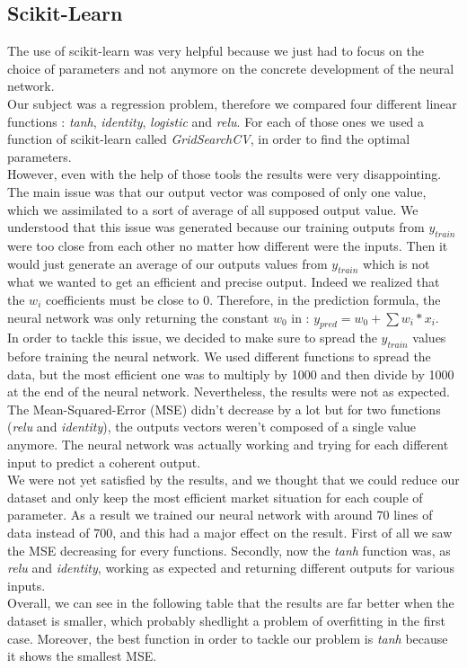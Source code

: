 \documentclass[]{article}
\begin{document}
\subsection{Scikit-Learn}
\vskip 0.3cm
The use of scikit-learn was very helpful because we just had to focus on the choice of parameters and not anymore on the concrete development of the neural network.\\
Our subject was a regression problem, therefore we compared four different linear functions : \textit{tanh}, \textit{identity}, \textit{logistic} and \textit{relu}.
For each of those ones we used a function of scikit-learn called \textit{GridSearchCV}, in order to find the optimal parameters. \\
However, even with the help of those tools the results were very disappointing. The main issue was that our output vector was composed of only one value, which we assimilated to a sort of average of all supposed output value. We understood that this issue was generated because our training outputs from $y_{train}$ were too close from each other no matter how different were the inputs. Then it would just generate an average of our outputs values from $y_{train}$  which is not what we wanted to get an efficient and precise output.  Indeed we realized that the \(w_{i}\) coefficients must be close to 0. Therefore, in the prediction formula, the neural network was only returning the constant \(w_{0}\) in : \(y_{pred} = w_{0} + \sum w_{i}*x_{i}\).\\

In order to tackle this issue, we decided to make sure to spread the \(y_{train}\) values before training the neural network. We used different functions to spread the data, but the most efficient one was to multiply by 1000 and then divide by 1000 at the end of the neural network. Nevertheless, the results were not as expected. The Mean-Squared-Error (MSE) didn't decrease by a lot but for two functions (\textit{relu} and \textit{identity}), the outputs vectors weren't composed of a single value anymore. The neural network was actually working and trying for each different input to predict a coherent output.\\
We were not yet satisfied by the results, and we thought that we could reduce our dataset and only keep the most efficient market situation for each couple of parameter. As a result we trained our neural network with around 70 lines of data instead of 700, and this had a major effect on the result. First of all we saw the MSE decreasing for every functions. Secondly, now the \textit{tanh} function was, as \textit{relu} and \textit{identity}, working as expected and returning different outputs for various inputs. \\
Overall, we can see in the following table that the results are far better when the dataset is smaller, which probably shedlight a problem of overfitting in the first case. Moreover, the best function in order to tackle our problem is \textit{tanh} because it shows the smallest MSE.\\
\end{document}
